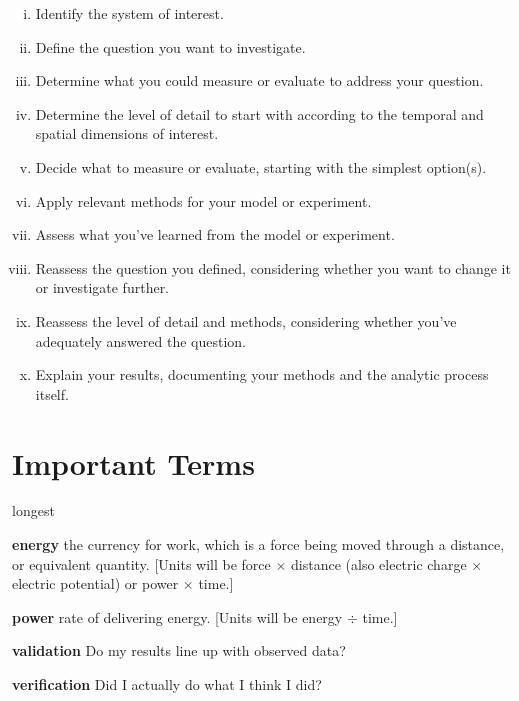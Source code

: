 \documentclass[10pt]{article}
\begin{document}
{\selectfont
\begin{enumerate}[(i)]
    \setlength{\itemsep}{0pt}
    \setlength{\parskip}{0pt}
    \item Identify the system of interest.
    \item Define the question you want to investigate.
    \item Determine what you could measure or evaluate to address your question.
    \item Determine the level of detail to start with according to the temporal and spatial dimensions of interest.
    \item Decide what to measure or evaluate, starting with the simplest option(s).
    \item Apply relevant methods for your model or experiment.
    \item Assess what you've learned from the model or experiment.
    \item Reassess the question you defined, considering whether you want to change it or investigate further.
    \item Reassess the level of detail and methods, considering whether you've adequately answered the question.
    \item Explain your results, documenting your methods and the analytic process itself.
\end{enumerate} 
}



\section{Important Terms}

\begin{labeling}{longest}
\item [\textbf{energy}] the currency for work, which is a force being moved through a distance, or equivalent quantity. [Units will be force $\times$ distance (also electric charge $\times$ electric potential) or power $\times$ time.]
\item [\textbf{power}] rate of delivering energy. [Units will be energy $\div$ time.]\\
\item [\textbf{validation}] Do my results line up with observed data?
\item [\textbf{verification}] Did I actually do what I think I did?
\end{labeling}
\end{document}
